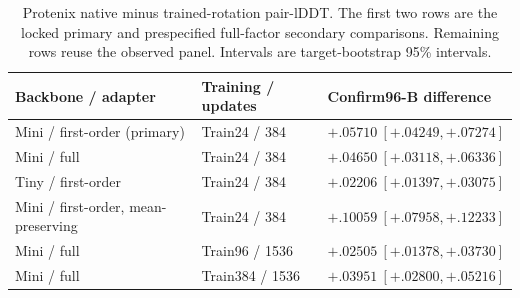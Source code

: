 \begin{table}[t]
\centering
\caption{Protenix native minus trained-rotation pair-lDDT. The first two rows are the locked primary and prespecified full-factor secondary comparisons. Remaining rows reuse the observed panel. Intervals are target-bootstrap 95\% intervals.}
\label{tab:protenix}
\small
\begin{tabularx}{\linewidth}{@{}Xll@{}}
\toprule
Backbone / adapter & Training / updates & Confirm96-B difference \\
\midrule
Mini / first-order (primary) & Train24 / 384 & $+.05710\ [+.04249,+.07274]$ \\
Mini / full & Train24 / 384 & $+.04650\ [+.03118,+.06336]$ \\
Tiny / first-order & Train24 / 384 & $+.02206\ [+.01397,+.03075]$ \\
Mini / first-order, mean-preserving & Train24 / 384 & $+.10059\ [+.07958,+.12233]$ \\
Mini / full & Train96 / 1536 & $+.02505\ [+.01378,+.03730]$ \\
Mini / full & Train384 / 1536 & $+.03951\ [+.02800,+.05216]$ \\
\bottomrule
\end{tabularx}
\end{table}
